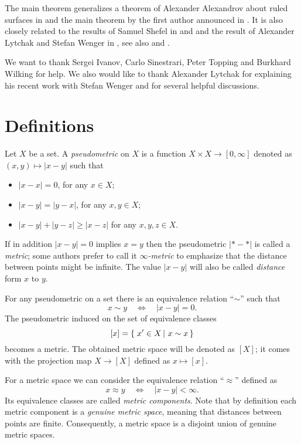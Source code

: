 \documentclass{article}
\begin{document}
The main theorem generalizes a theorem of Alexander Alexandrov about ruled surfaces in \cite{A} and the main theorem by the first author announced in \cite{petrunin-metric-min}.
It is also closely related to the results of Samuel Shefel in \cite{shefel-2D} and \cite{shefel-3D} and the result of Alexander Lytchak and Stefan Wenger 
in \cite{LW5}, see also \cite[Chapter 4]{akp} and \cite{petrunin-stadler}. 

We want to thank 
Sergei Ivanov, 
Carlo Sinestrari, 
Peter Topping 
and Burkhard Wilking 
for help.
We also would like to thank Alexander Lytchak for explaining his recent work with Stefan Wenger and for several helpful discussions.


\section{Definitions}

Let $X$ be a set.
A \emph{pseudometric} on $X$ 
is a function $X\times X\to[0,\infty]$ denoted as $(x,y)\mapsto |x-y|$
such that 
\begin{itemize}
\item $|x-x|=0$, for any $x\in X$;
\item $|x-y|=|y-x|$, for any $x,y\in X$;
\item $|x-y|+|y-z|\ge|x-z|$ for any  $x,y,z\in X$.
\end{itemize}
If in addition $|x-y|=0$ implies $x=y$ then the pseudometric $|{*}-{*}|$ is called a \emph{metric}; some authors prefer to call it \emph{$\infty$-metric} to emphasize that the distance between points might be infinite.
The value $|x-y|$ will also be called \emph{distance} form $x$ to $y$.

For any pseudometric on a set there is an equivalence relation ``$\sim$'' such that 
\[x\sim y\quad\iff\quad|x-y|=0.\]
The pseudometric induced  on the set of equivalence classes 
\[[x]=\set{x'\in X}{x\sim x}\] becomes a metric.
The obtained metric space will be denoted as $[X]$;
it comes with the projection map $X\to [X]$ defined as $x\mapsto [x]$.


For a metric space we can consider the equivalence relation ``$\approx$'' defined as 
\[x\approx y\quad\iff\quad|x-y|<\infty.\]
Its equivalence classes are called \emph{metric components}.
Note that by definition each metric component is a \emph{genuine metric space}, meaning that distances between points are finite.
Consequently, a metric space is a disjoint union of genuine metric spaces.
\end{document}
